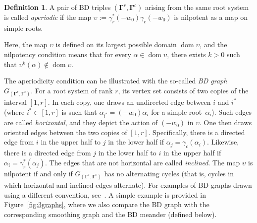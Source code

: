 \documentclass[11pt]{article}
\newcommand{\bg}{\mathbf{\Gamma}}
\DeclareMathOperator{\dom}{dom}
\theoremstyle{definition}\newtheorem{definition}[theorem]{Definition}
\theoremstyle{definition}\newtheorem{remark}[theorem]{Remark}
\theoremstyle{remark}
\numberwithin{equation}{section}
\begin{document}
\begin{definition}\label{d:aperiodic}
    A pair of BD triples $(\bg^r,\bg^c)$ arising from the same root system is called \emph{aperiodic} if the map $\upsilon:=\gamma_r^*(-w_0)\gamma_c(-w_0)$ is nilpotent as a map on simple roots.
\end{definition}
Here, the map $\upsilon$ is defined on its largest possible domain $\dom \upsilon$, and the nilpotency condition means that for every $\alpha \in \dom \upsilon$, there exists $k > 0$ such that $\upsilon^k(\alpha) \notin \dom \upsilon$.

The aperiodicity condition can be illustrated with the so-called \emph{BD graph} $G_{(\bg^r,\bg^c)}$. For a root system of rank $r$, its vertex set consists of two copies of the interval $[1,r]$. In each copy, one draws an undirected edge between $i$ and $i^*$ (where $i^* \in [1,r]$ is such that $\alpha_{i^*} = (-w_0) \alpha_i$ for a simple root~$\alpha_i$). Such edges are called \emph{horizontal}, and they depict the action of $(-w_0)$ in $\upsilon$. One then draws oriented edges between the two copies of $[1,r]$. Specifically, there is a directed edge from $i$ in the upper half to $j$ in the lower half if $\alpha_j = \gamma_c(\alpha_i)$. Likewise, there is a directed edge from $j$ in the lower half to $i$ in the upper half if $\alpha_i = \gamma_r^*(\alpha_j)$. 
The edges that are not horizontal are called \emph{inclined}. The map $\upsilon$ is nilpotent if and only if $G_{(\bg^r,\bg^c)}$ has no alternating cycles (that is, cycles in which horizontal and inclined edges alternate). For examples of BD graphs drawn using a different convention,
see~\cite{gsv-plethora,multdual}. A simple example is provided in Figure~\ref{fig:3graphs}, where we also compare the BD graph with the corresponding smoothing graph and the BD meander (defined below).
\end{document}
